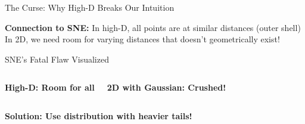 \documentclass[aspectratio=169]{beamer}
\begin{document}
\begin{frame}{The Curse: Why High-D Breaks Our Intuition}
\vspace{3mm}
\begin{center}
\colorbox{orange!20}{\parbox{0.9\textwidth}{\centering
\textbf{Connection to SNE:} In high-D, all points are at similar distances (outer shell)\\
In 2D, we need room for varying distances that doesn't geometrically exist!}}
\end{center}
\end{frame}

\begin{frame}{SNE's Fatal Flaw Visualized}
\begin{columns}
\begin{center}
\textbf{High-D: Room for all}\\[0.3cm]
\end{center}

\begin{center}
\textbf{2D with Gaussian: Crushed!}\\[0.3cm]
\end{center}
\end{columns}

\vspace{0.3cm}
\begin{center}
\Large\textbf{Solution: Use distribution with heavier tails!}
\end{center}
\end{frame}
\end{document}
